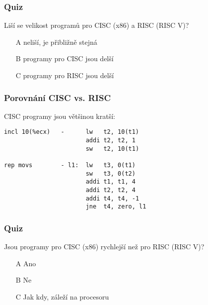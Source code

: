 \documentclass{beamer}
\begin{document}
\begin{frame}
\frametitle{Quiz}
Liší se velikost programů pro CISC (x86) a RISC (RISC V)?
\begin{itemize}
\item[A] neliší, je přibližně stejná
\item[B] programy pro CISC jsou delší
\item[C] programy pro RISC jsou delší
\end{itemize}

\end{frame}


\begin{frame}[fragile]
\frametitle{Porovnání CISC vs. RISC}
CISC programy jsou většinou kratší:
\begin{verbatim}
incl 10(%ecx)   -      lw   t2, 10(t1)
                       addi t2, t2, 1
                       sw   t2, 10(t1)

rep movs        - l1:  lw   t3, 0(t1) 
                       sw   t3, 0(t2)
                       addi t1, t1, 4
                       addi t2, t2, 4
                       addi t4, t4, -1
                       jne  t4, zero, l1 
\end{verbatim}

\end{frame}

\begin{frame}
\frametitle{Quiz}
Jsou programy pro CISC (x86) rychlejší než pro RISC (RISC V)?
\begin{itemize}
\item[A] Ano 
\item[B] Ne
\item[C] Jak kdy, záleží na procesoru
\end{itemize}

\end{frame}
\end{document}
